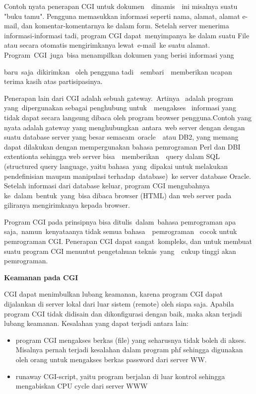 \documentclass{wileySix}
\begin{document}
\vspace{12pt}
Contoh nyata penerapan CGI untuk dokumen~~dinamis~~ini  misalnya  suatu "buku tamu". Pengguna memasukkan informasi seperti nama, alamat, alamat e-mail, dan komentar-komentarnya ke dalam form. Setelah server menerima informasi-informasi tadi, program CGI dapat~menyimpanya ke dalam  suatu File atau secara otomatis mengirimkanya lewat~e-mail~ke  suatu  alamat. Program~CGI~juga~bisa menampilkan dokumen yang  berisi  informasi  yang \par
\noindent 
baru~saja~dikirimkan~ oleh  pengguna  tadi~~sembari~~memberikan  ucapan  terima kasih atas partisipasinya. \par
\vspace{12pt}
Penerapan lain dari CGI adalah sebuah gateway.~Artinya~ adalah  program yang~dipergunakan sebagai penghubung  untuk~~mengakses~ informasi  yang tidak dapat secara langsung dibaca oleh program browser pengguna.Contoh yang nyata adalah gateway yang menghubungkan~antara~web  server  dengan dengan suatu database server yang besar semacam~oracle~~atau  DB2, yang  memang dapat dilakukan dengan mempergunakan bahasa pemrograman Perl dan DBI extentionta sehingga web server bisa~~memberikan~~query  dalam  SQL (structured query language, yaitu bahasa~yang~dipakai  untuk  melakukan pendefinisian maupun manipulasi terhadap~database)~ke  server  database Oracle. Setelah informasi dari database keluar, program CGI mengubahnya ke~dalam~bentuk~yang~bisa dibaca browser (HTML)  dan  web  server  pada giliranya mengirimkanya kepada browser. \par
\vspace{12pt}
Program CGI pada prinsipnya bisa ditulis~dalam~bahasa  pemrograman  apa saja,~namun~kenyataanya tidak  semua  bahasa~~pemrograman~ cocok  untuk pemrograman CGI. Penerapan CGI dapat sangat~kompleks, dan untuk membuat  suatu program CGI menuntut pengetahuan teknis~yang~~cukup  tinggi  akan pemrograman. \par
\vspace{12pt}
\vspace{12pt}
\noindent 
\textbf{Keamanan pada CGI} \par
CGI dapat menimbulkan lubang keamanan, karena program CGI dapat dijalankan di server lokal dari luar sistem (remote) oleh siapa saja. Apabila program CGI tidak didisain dan dikonfigurasi dengan baik, maka akan terjadi lubang keamanan. Kesalahan yang dapat terjadi antara lain: \par
\noindent 
\begin{itemize}
	\item program CGI mengakses berkas (file) yang seharusnya tidak boleh di akses. Misalnya pernah terjadi kesalahan dalam program phf sehingga digunakan oleh orang untuk mengakses berkas password dari server WW. \par
	\noindent 
	\item runaway CGI-script, yaitu program berjalan di luar kontrol sehingga mengabiskan CPU cycle dari server WWW\end{itemize}
\end{document}
